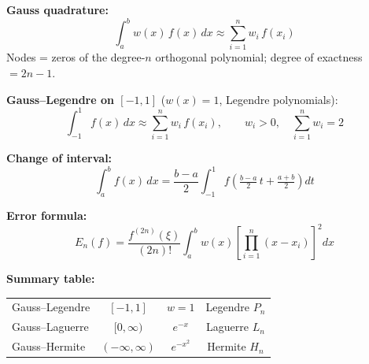 \begin{keyformulas}
\textbf{Gauss quadrature:}
\[
    \int_a^b w(x)\,f(x)\,dx \approx \sum_{i=1}^{n} w_i\,f(x_i)
\]
Nodes = zeros of the degree-$n$ orthogonal polynomial; degree of exactness $= 2n-1$.

\textbf{Gauss--Legendre on $[-1,1]$} ($w(x) = 1$, Legendre polynomials):
\[
    \int_{-1}^{1} f(x)\,dx \approx \sum_{i=1}^{n} w_i\,f(x_i), \qquad w_i > 0, \quad \sum_{i=1}^n w_i = 2
\]

\textbf{Change of interval:}
\[
    \int_a^b f(x)\,dx = \frac{b-a}{2}\int_{-1}^{1} f\!\left(\tfrac{b-a}{2}\,t + \tfrac{a+b}{2}\right)dt
\]

\textbf{Error formula:}
\[
    E_n(f) = \frac{f^{(2n)}(\xi)}{(2n)!}\int_a^b w(x)\left[\prod_{i=1}^{n}(x-x_i)\right]^2 dx
\]

\textbf{Summary table:}
\begin{center}
\begin{tabular}{lccc}
    Gauss--Legendre & $[-1,1]$ & $w=1$ & Legendre $P_n$ \\
    Gauss--Laguerre & $[0,\infty)$ & $e^{-x}$ & Laguerre $L_n$ \\
    Gauss--Hermite  & $(-\infty,\infty)$ & $e^{-x^2}$ & Hermite $H_n$ \\
\end{tabular}
\end{center}
\end{keyformulas}
